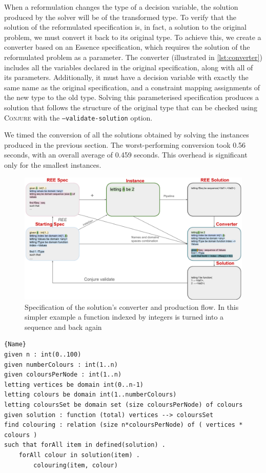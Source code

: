 \documentclass[anonymous,a4paper,UKenglish,cleveref,pdfa]{lipics-v2021}
\newcommand{\conjure}{\textsc{Conjure}\xspace}
\newcommand{\code}[1]{{\small\texttt{{#1}}}}
\begin{document}
When a reformulation changes the type of a decision variable, the solution produced by the solver will be of the transformed type. To verify that the solution of the reformulated specification is, in fact, a solution to the original problem, we must convert it back to its original type. To achieve this, we create a converter based on an {\sc Essence} specification, which requires the solution of the reformulated problem as a parameter. The converter (illustrated in \cref{lst:converter}) includes all the variables declared in the original specification, along with all of its parameters. Additionally, it must have a decision variable with exactly the same name as the original specification, and a constraint mapping assignments of the new type to the old type. Solving this parameterised specification produces a solution that follows the structure of the original type that can be checked using \conjure with the \code{--validate-solution} option.

We timed the conversion of all the solutions obtained by solving the instances produced in the previous section. The worst-performing conversion took 0.56 seconds, with an overall average of 0.459 seconds. This overhead is significant only for the smallest instances.
\begin{figure}[h]
    \centering
    \includegraphics[width=\columnwidth]{ConverterCraft.pdf}
    \caption{Specification of the solution's converter and production flow. In this simpler example a function indexed by integers is turned into a sequence and back again}
\end{figure}

\begin{lstlisting}[caption=Solution Converter,label={lst:converter},frame=tlrb]{Name}
given n : int(0..100)
given numberColours : int(1..n)
given coloursPerNode : int(1..n)
letting vertices be domain int(0..n-1)
letting colours be domain int(1..numberColours)
letting coloursSet be domain set (size coloursPerNode) of colours
given solution : function (total) vertices --> coloursSet
find colouring : relation (size n*coloursPerNode) of ( vertices * colours )
such that forAll item in defined(solution) .
    forAll colour in solution(item) .
        colouring(item, colour)
\end{lstlisting}
\end{document}
